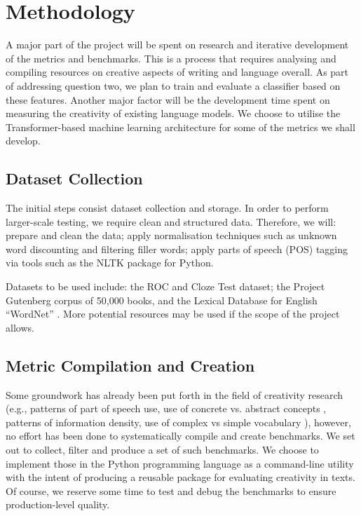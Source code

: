 \documentclass[a4paper,12pt]{article}
\begin{document}


\section*{Methodology}
A major part of the project will be spent on research and iterative development of the metrics and benchmarks. This is a process that requires analysing and compiling resources on creative aspects of writing and language overall. As part of addressing question two, we plan to train and evaluate a classifier based on these features. 
Another major factor will be the development time spent on measuring the creativity of existing language models. We choose to utilise the Transformer-based machine learning architecture\cite{vaswani_attention_2017} for some of the metrics we shall develop. 

\subsection*{Dataset Collection}
The initial steps consist dataset collection and storage. In order to perform larger-scale testing, we require clean and structured data. Therefore, we will: prepare and clean the data; apply normalisation techniques such as unknown word discounting and filtering filler words; apply parts of speech (POS) tagging via tools such as the NLTK package for Python\cite{nltk_citation}.  

Datasets to be used include: the ROC and Cloze Test dataset\cite{mostafazadeh-etal-2016-corpus}; the Project Gutenberg corpus of 50,000 books\cite{gutenberg_dataset}, and the Lexical Database for English ``WordNet'' \cite{wordnet_princeton}. More potential resources may be used if the scope of the project allows.

\subsection*{Metric Compilation and Creation}
Some groundwork has already been put forth in the field of creativity research (e.g., patterns of part of speech use, use of concrete vs. abstract concepts \cite{brysbaert2014concreteness}, patterns of information density\cite{giulianelli2021analysing}, use of complex vs simple vocabulary \cite{kuperman2012age}), however, no effort has been done to systematically compile and create benchmarks. 
We set out to collect, filter and produce a set of such benchmarks. We choose to implement those in the Python programming language as a command-line utility with the intent of producing a reusable package for evaluating creativity in texts. Of course, we reserve some time to test and debug the benchmarks to ensure production-level quality.
\end{document}

